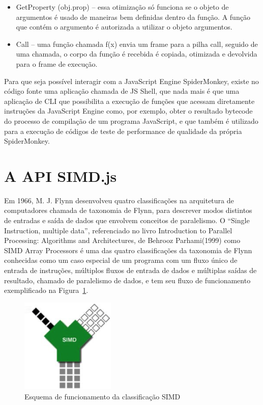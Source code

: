 \documentclass[12pt,a4paper]{article}
\begin{document}
\begin{itemize}
	\item GetProperty (obj.prop) – essa otimização só funciona se o objeto de argumentos é usado de maneiras bem definidas dentro da função. A função que contém o argumento é autorizada a utilizar o objeto argumentos.
	\item Call – uma função chamada f(x) envia um frame para a pilha call, seguido de uma chamada, o corpo da função é recebida é copiada, otimizada e devolvida para o frame de execução.
\end{itemize}

Para que seja possível interagir com a JavaScript Engine SpiderMonkey, existe no código fonte uma aplicação chamada de JS Shell, que nada mais é que uma aplicação de CLI que possibilita a execução de funções que acessam diretamente instruções da JavaScript Engine como, por exemplo, obter o resultado bytecode do processo de compilação de um programa JavaScript, e que também é utilizado para a execução de códigos de teste de performance de qualidade da própria SpiderMonkey. \\


\section{A API SIMD.js}
\label{sec:section7}

Em 1966, M. J. Flynn desenvolveu quatro classificações na arquitetura de computadores chamada de taxonomia de Flynn, para descrever modos distintos de entradas e saída de dados que envolvem conceitos de paralelismo. O “Single Instruction, multiple data”, referenciado no livro Introduction to Parallel Processing: Algorithms and Architectures, de Behrooz Parhami(1999) como SIMD Array Processors é uma das quatro classificações da taxonomia de Flynn conhecidas como um caso especial de um programa com um fluxo único de entrada de instruções, múltiplos fluxos de entrada de dados e múltiplas saídas de resultado, chamado de paralelismo de dados, e tem seu fluxo de funcionamento exemplificado na Figura~\ref{fig:figura6}. \\

\begin{figure}[h]
	\centering
	\includegraphics[width=0.4\textwidth]{figura6.png}
	\caption{Esquema de funcionamento da classificação SIMD}
	\label{fig:figura6}
\end{figure}
\end{document}
